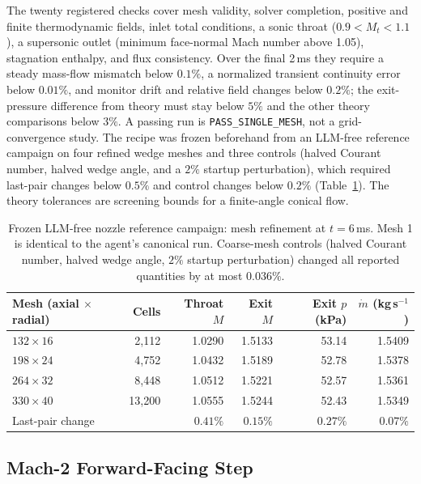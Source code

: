 \documentclass[11pt]{article}
\begin{document}
The twenty registered checks cover mesh validity, solver completion, positive
and finite thermodynamic fields, inlet total conditions, a sonic throat
($0.9<M_t<1.1$), a supersonic outlet (minimum face-normal Mach number above
1.05), stagnation enthalpy, and flux consistency. Over the final 2\,ms they
require a steady mass-flow mismatch below $0.1\%$, a normalized transient
continuity error below $0.01\%$, and monitor drift and relative field changes
below $0.2\%$; the exit-pressure difference from theory must stay below $5\%$
and the other theory comparisons below $3\%$. A passing run is
\texttt{PASS\_SINGLE\_MESH}, not a grid-convergence study. The recipe was
frozen beforehand from an LLM-free reference campaign on four refined wedge
meshes and three controls (halved Courant number, halved wedge angle, and a
$2\%$ startup perturbation), which required last-pair changes below $0.5\%$
and control changes below $0.2\%$ (Table~\ref{tab:nozzle_grid}). The theory
tolerances are screening bounds for a finite-angle conical flow.

\begin{table}[!htbp]
\centering
\caption{Frozen LLM-free nozzle reference campaign: mesh refinement at
$t=6$\,ms. Mesh 1 is identical to the agent's canonical run. Coarse-mesh
controls (halved Courant number, halved wedge angle, $2\%$ startup
perturbation) changed all reported quantities by at most $0.036\%$.}
\label{tab:nozzle_grid}
\small
\begin{tabular}{@{}lrrrrr@{}}
\toprule
Mesh (axial $\times$ radial) & Cells & Throat $M$ & Exit $M$ & Exit $p$ (kPa) & $\dot m$ (kg\,s$^{-1}$) \\
\midrule
$132\times16$ & 2,112 & 1.0290 & 1.5133 & 53.14 & 1.5409 \\
$198\times24$ & 4,752 & 1.0432 & 1.5189 & 52.78 & 1.5378 \\
$264\times32$ & 8,448 & 1.0512 & 1.5221 & 52.57 & 1.5361 \\
$330\times40$ & 13,200 & 1.0555 & 1.5244 & 52.43 & 1.5349 \\
\midrule
Last-pair change & & $0.41\%$ & $0.15\%$ & $0.27\%$ & $0.07\%$ \\
\bottomrule
\end{tabular}
\end{table}

\subsection{Mach-2 Forward-Facing Step}
\label{sec:step_setup}
\end{document}
